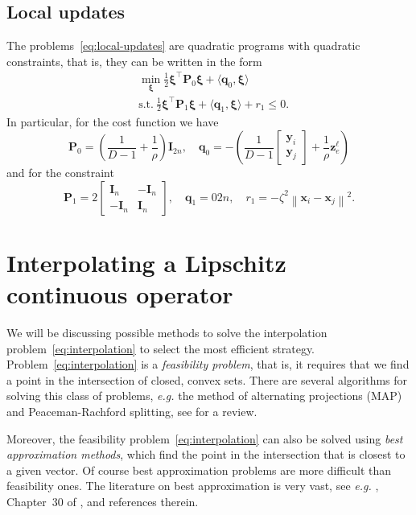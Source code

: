 \documentclass{article}
\newcommand{\norm}[1]{\left\lVert#1\right\rVert}
\newcommand{\q}{\mathbold{q}}
\newcommand{\x}{\mathbold{x}}
\newcommand{\y}{\mathbold{y}}
\newcommand{\z}{\mathbold{z}}
\newcommand{\xx}{\pmb{\xi}}
\renewcommand{\Im}{\mathbold{I}}
\newcommand{\Pm}{\mathbold{P}}
\begin{document}
\subsection{Local updates}
The problems~\eqref{eq:local-updates} are quadratic programs with quadratic constraints, that is, they can be written in the form
\begin{subequations}
\begin{align}
	&\min_{\xx} \frac{1}{2} \xx^\top \Pm_0 \xx + \langle \q_0, \xx \rangle \\
	&\text{s.t.} \ \frac{1}{2} \xx^\top \Pm_1 \xx + \langle \q_1, \xx \rangle + r_1 \leq 0.
\end{align}
\end{subequations}
In particular, for the cost function we have
$$
	\Pm_0 = \left( \frac{1}{D-1} + \frac{1}{\rho} \right) \Im_{2n}, \quad \q_0 = - \left( \frac{1}{D-1} \begin{bmatrix} \y_i \\ \y_j \end{bmatrix} + \frac{1}{\rho} \z_e^\ell \right)
$$
and for the constraint
$$
	\Pm_1 = 2 \begin{bmatrix} \Im_n & - \Im_n \\ - \Im_n & \Im_n \end{bmatrix}, \quad \q_1 = 0{2n}, \quad r_1 = - \zeta^2 \norm{\x_i - \x_j}^2.
$$


\section{Interpolating a Lipschitz continuous operator}

We will be discussing possible methods to solve the interpolation problem~\eqref{eq:interpolation} to select the most efficient strategy. Problem~\eqref{eq:interpolation} is a \emph{feasibility problem}, that is, it requires that we find a point in the intersection of closed, convex sets. There are several algorithms for solving this class of problems, \emph{e.g.} the method of alternating projections (MAP) and Peaceman-Rachford splitting, see \cite{reich_projection_2015} for a review.

Moreover, the feasibility problem~\eqref{eq:interpolation} can also be solved using \emph{best approximation methods}, which find the point in the intersection that is closest to a given vector. Of course best approximation problems are more difficult than feasibility ones. The literature on best approximation is very vast, see \emph{e.g.} \cite{reich_projection_2015}, Chapter~30 of \cite{bauschke_convex_2017}, \cite{artacho_new_2018} and references therein.
\end{document}

